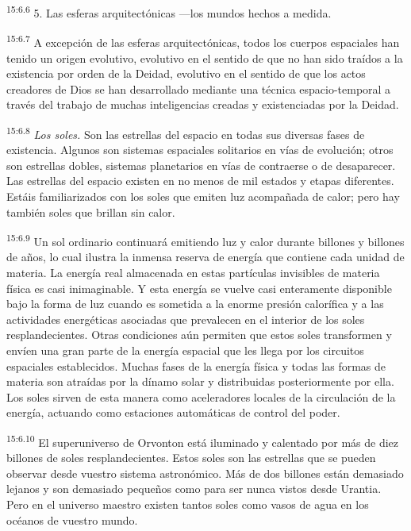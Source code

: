 \par
\textsuperscript{15:6.6} 5. Las esferas arquitectónicas ---los mundos hechos a medida.

\par
\textsuperscript{15:6.7} A excepción de las esferas arquitectónicas, todos los cuerpos espaciales han tenido un origen evolutivo, evolutivo en el sentido de que no han sido traídos a la existencia por orden de la Deidad, evolutivo en el sentido de que los actos creadores de Dios se han desarrollado mediante una técnica espacio-temporal a través del trabajo de muchas inteligencias creadas y existenciadas por la Deidad.

\par
\textsuperscript{15:6.8} \textit{Los soles.} Son las estrellas del espacio en todas sus diversas fases de existencia. Algunos son sistemas espaciales solitarios en vías de evolución; otros son estrellas dobles, sistemas planetarios en vías de contraerse o de desaparecer. Las estrellas del espacio existen en no menos de mil estados y etapas diferentes. Estáis familiarizados con los soles que emiten luz acompañada de calor; pero hay también soles que brillan sin calor.

\par
\textsuperscript{15:6.9} Un sol ordinario continuará emitiendo luz y calor durante billones y billones de años, lo cual ilustra la inmensa reserva de energía que contiene cada unidad de materia. La energía real almacenada en estas partículas invisibles de materia física es casi inimaginable. Y esta energía se vuelve casi enteramente disponible bajo la forma de luz cuando es sometida a la enorme presión calorífica y a las actividades energéticas asociadas que prevalecen en el interior de los soles resplandecientes. Otras condiciones aún permiten que estos soles transformen y envíen una gran parte de la energía espacial que les llega por los circuitos espaciales establecidos. Muchas fases de la energía física y todas las formas de materia son atraídas por la dínamo solar y distribuidas posteriormente por ella. Los soles sirven de esta manera como aceleradores locales de la circulación de la energía, actuando como estaciones automáticas de control del poder.

\par
\textsuperscript{15:6.10} El superuniverso de Orvonton está iluminado y calentado por más de diez billones de soles resplandecientes. Estos soles son las estrellas que se pueden observar desde vuestro sistema astronómico. Más de dos billones están demasiado lejanos y son demasiado pequeños como para ser nunca vistos desde Urantia. Pero en el universo maestro existen tantos soles como vasos de agua en los océanos de vuestro mundo.

